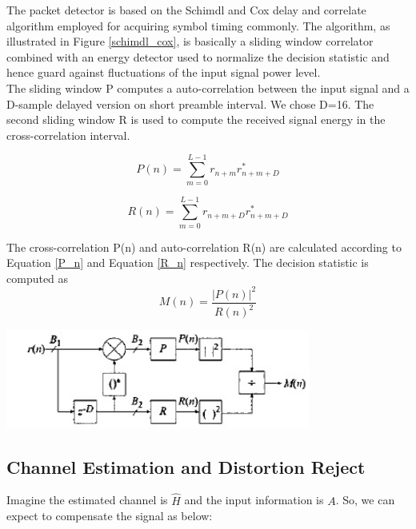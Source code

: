 The packet detector is based on the Schimdl and Cox delay and correlate algorithm employed for acquiring symbol timing commonly. The algorithm, as illustrated in Figure \ref{schimdl_cox}, is basically a sliding window correlator combined with an energy detector used to normalize the decision statistic and hence guard against fluctuations of the input signal power level.\\

The sliding window P computes a auto-correlation between the input signal and a D-sample delayed version on short preamble interval. We chose D=16. The second sliding window R is used to compute the received signal energy in the cross-correlation interval.

\begin{equation} \label{P_n}
P(n) = \sum\limits_{m=0}^{L-1} r_{n+m} r^{*}_{n+m+D}
\end{equation}

\begin{equation} \label{R_n}
 R(n) = \sum\limits_{m=0}^{L-1} r_{n+m+D} r^{*}_{n+m+D}
\end{equation}

The cross-correlation P(n) and auto-correlation R(n) are calculated according to Equation \ref{P_n} and Equation \ref{R_n} respectively. The decision statistic is computed as\\

\begin{equation} \label{M_n}
M(n)= \dfrac{|P(n)|^{2}}{R(n)^{2}}
\end{equation}


\begin{center}
\includegraphics[width=10cm]{content/fig/schimdl_cox.JPG}
\label{schimdl_cox}
\end{center}

\subsection{Channel Estimation and Distortion Reject}
\label{section:channel_est}

Imagine the estimated channel is $\hat{H}$ and the input information is $A$. So, we can expect to compensate the signal as below:\\

